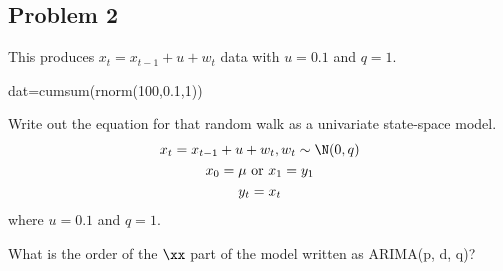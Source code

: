 \subsection*{Problem 2}
This produces $x_t = x_{t-1} + u + w_t$ data with $u=0.1$ and $q=1$.
\begin{Schunk}
\begin{Sinput}
 dat=cumsum(rnorm(100,0.1,1))
\end{Sinput}
\end{Schunk}

\begin{wideitemize}
\item Write out the equation for that random walk as a univariate state-space model. 
\begin{equation}
\begin{gathered}
x_t = x_{t-1} + u + w_t, w_t \sim \N(0,q) \\
x_0 = \mu \text{ or } x_1 = y_1 \\
y_t = x_t
\end{gathered}
\end{equation}
where $u=0.1$ and $q=1$.
\item What is the order of the $\xx$ part of the model written as ARIMA(p, d, q)?  


\end{wideitemize}
